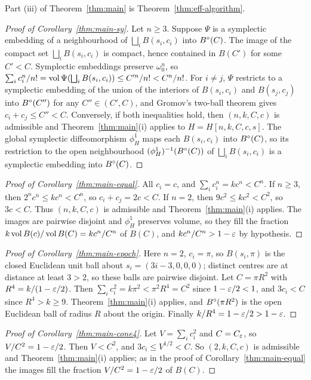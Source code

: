 Part (iii) of Theorem~\ref{thm:main} is Theorem~\ref{thm:eff-algorithm}.

\begin{proof}[Proof of Corollary~\ref{thm:main-sy}]
Let $n\ge3$. Suppose $\Psi$ is a symplectic embedding of a neighbourhood of $\bigsqcup_iB(s_i,c_i)$ into $B^{\circ}(C)$. The
image of the compact set $\bigsqcup_iB(s_i,c_i)$ is compact, hence contained in $B(C')$ for some $C'<C$. Symplectic
embeddings preserve $\omega_0^n$, so $\sum_ic_i^n/n!=\operatorname{vol}\Psi(\bigsqcup_iB(s_i,c_i))\le C'^n/n!<C^n/n!$. For $i\ne j$,
$\Psi$ restricts to a symplectic embedding of the union of the interiors of $B(s_i,c_i)$ and $B(s_j,c_j)$ into
$B^{\circ}(C'')$ for any $C''\in(C',C)$, and Gromov's two-ball theorem \cite{Gromov1985} gives $c_i+c_j\le C''<C$. Conversely,
if both inequalities hold, then $(n,k,C,c)$ is admissible and Theorem~\ref{thm:main}(i) applies to $H=H[n,k,C,c,s]$. The
global symplectic diffeomorphism $\phi^1_H$ maps each $B(s_i,c_i)$ into $B^{\circ}(C)$, so its restriction to the open
neighbourhood $(\phi^1_H)^{-1}(B^{\circ}(C))$ of $\bigsqcup_iB(s_i,c_i)$ is a symplectic embedding into $B^{\circ}(C)$.
\end{proof}

\begin{proof}[Proof of Corollary~\ref{thm:main-equal}]
All $c_i=c$, and $\sum_ic_i^n=kc^n<C^n$. If $n\ge3$, then $2^nc^n\le kc^n<C^n$, so $c_i+c_j=2c<C$. If $n=2$, then
$9c^2\le kc^2<C^2$, so $3c<C$. Thus $(n,k,C,c)$ is admissible and Theorem~\ref{thm:main}(i) applies. The images are
pairwise disjoint and $\phi^1_H$ preserves volume, so they fill the fraction $k\operatorname{vol} B(c)/\operatorname{vol} B(C)=kc^n/C^n$ of $B(C)$,
and $kc^n/C^n>1-\varepsilon$ by hypothesis.
\end{proof}

\begin{proof}[Proof of Corollary~\ref{thm:main-epoch}]
Here $n=2$, $c_i=\pi$, so $B(s_i,\pi)$ is the closed Euclidean unit ball about $s_i=(3i-3,0,0,0)$; distinct centres are at
distance at least $3>2$, so these balls are pairwise disjoint. Let $C=\pi R^2$ with $R^4=k/(1-\varepsilon/2)$. Then
$\sum_ic_i^2=k\pi^2<\pi^2R^4=C^2$ since $1-\varepsilon/2<1$, and $3c_i<C$ since $R^4>k\ge9$. Theorem~\ref{thm:main}(i) applies,
and $B^{\circ}(\pi R^2)$ is the open Euclidean ball of radius $R$ about the origin. Finally $k/R^4=1-\varepsilon/2>1-\varepsilon$.
\end{proof}

\begin{proof}[Proof of Corollary~\ref{thm:main-cone4}]
Let $V=\sum_ic_i^2$ and $C=C_\varepsilon$, so $V/C^2=1-\varepsilon/2$. Then $V<C^2$, and $3c_i\le V^{1/2}<C$. So $(2,k,C,c)$ is
admissible and Theorem~\ref{thm:main}(i) applies; as in the proof of Corollary~\ref{thm:main-equal} the images fill the
fraction $V/C^2=1-\varepsilon/2$ of $B(C)$.
\end{proof}
